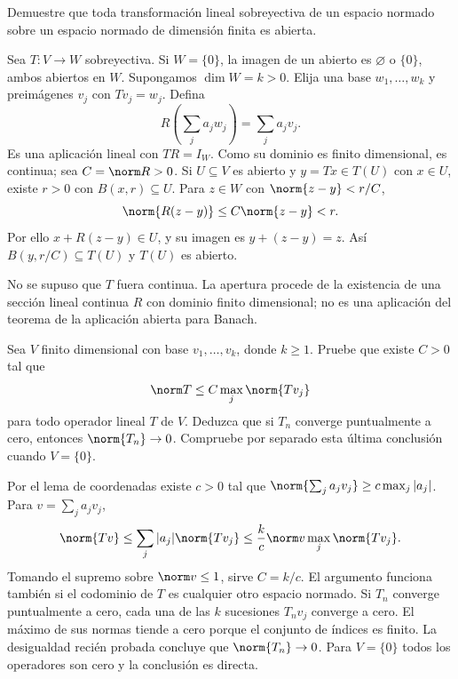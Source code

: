 \begin{ejercicio}\label{ej:lectura-22-1}
Demuestre que toda transformación lineal sobreyectiva de un espacio normado sobre un espacio normado de dimensión finita es abierta.
\end{ejercicio}
\begin{solucion}
Sea $T:V\to W$ sobreyectiva. Si $W=\{0\}$, la imagen de un abierto es $\varnothing$ o $\{0\}$, ambos abiertos en $W$. Supongamos $\dim W=k>0$. Elija una base $w_1,\ldots,w_k$ y preimágenes $v_j$ con $Tv_j=w_j$. Defina
\[
 R\left(\sum_j a_jw_j\right)=\sum_j a_jv_j.
\]
Es una aplicación lineal con $TR=I_W$. Como su dominio es finito dimensional, es continua; sea $C=\norm R>0$. Si $U\subseteq V$ es abierto y $y=Tx\in T(U)$ con $x\in U$, existe $r>0$ con $B(x,r)\subseteq U$. Para $z\in W$ con $\norm{z-y}<r/C$,
\[
 \norm{R(z-y)}\leq C\norm{z-y}<r.
\]
Por ello $x+R(z-y)\in U$, y su imagen es $y+(z-y)=z$. Así $B(y,r/C)\subseteq T(U)$ y $T(U)$ es abierto.

No se supuso que $T$ fuera continua. La apertura procede de la existencia de una sección lineal continua $R$ con dominio finito dimensional; no es una aplicación del teorema de la aplicación abierta para Banach.
\end{solucion}

\begin{ejercicio}\label{ej:lectura-22-2}
Sea $V$ finito dimensional con base $v_1,\ldots,v_k$, donde $k\geq1$. Pruebe que existe $C>0$ tal que
\[
 \norm T\leq C\max_j\norm{Tv_j}
\]
para todo operador lineal $T$ de $V$. Deduzca que si $T_n$ converge puntualmente a cero, entonces $\norm{T_n}\to0$. Compruebe por separado esta última conclusión cuando $V=\{0\}$.
\end{ejercicio}
\begin{solucion}
Por el lema de coordenadas existe $c>0$ tal que $\norm{\sum_j a_jv_j}\geq c\max_j|a_j|$. Para $v=\sum_j a_jv_j$,
\[
 \norm{Tv}\leq\sum_j|a_j|\norm{Tv_j}
 \leq\frac kc\norm v\max_j\norm{Tv_j}.
\]
Tomando el supremo sobre $\norm v\leq1$, sirve $C=k/c$. El argumento funciona también si el codominio de $T$ es cualquier otro espacio normado. Si $T_n$ converge puntualmente a cero, cada una de las $k$ sucesiones $T_nv_j$ converge a cero. El máximo de sus normas tiende a cero porque el conjunto de índices es finito. La desigualdad recién probada concluye que $\norm{T_n}\to0$. Para $V=\{0\}$ todos los operadores son cero y la conclusión es directa.
\end{solucion}

